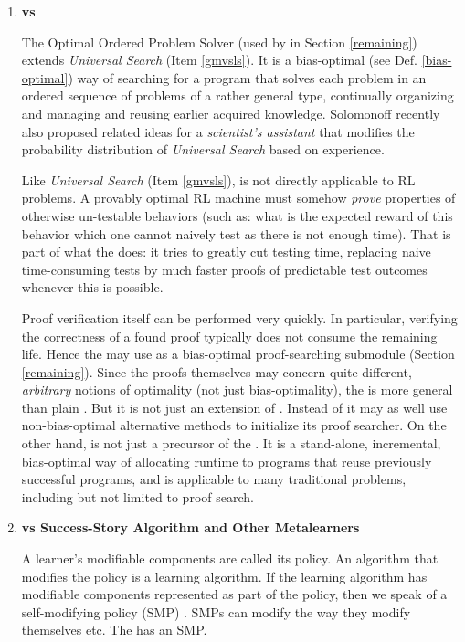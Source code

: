 \begin{enumerate}
\item{\bf \GM vs \Oops}
\label{oopsrl}
 
The Optimal  Ordered Problem Solver
\Oops \cite{Schmidhuber:04oops,Schmidhuber:03nips}
(used by \Biops in Section \ref{remaining}) extends
{\em Universal Search} (Item \ref{gmvsls}). It is a bias-optimal (see Def. \ref{bias-optimal})
way of searching for a
program that solves each problem in an ordered  sequence
of problems of a rather general type,
continually organizing and managing and reusing earlier acquired knowledge.
Solomonoff recently also proposed related
ideas for a {\em scientist's assistant}
\cite{Solomonoff:03} that modifies the probability
distribution of {\em Universal Search} \cite{Levin:73} based
on experience.

Like {\em Universal Search} (Item \ref{gmvsls}), 
\Oops is not directly applicable to
RL problems.  A provably optimal RL machine
must somehow {\em prove} properties of otherwise un-testable behaviors
(such as: what is the expected reward of this behavior which
one cannot naively test as there is not enough time).
That is part of what the \gm does: it tries
to greatly cut testing time, replacing naive time-consuming
tests by much faster proofs of predictable test outcomes
whenever this is possible.

Proof verification
itself can be performed very quickly. In particular,
verifying the correctness of
a found proof typically does not consume the remaining life.
Hence the \gm may use \Oops as a bias-optimal proof-searching
submodule (Section \ref{remaining}). Since the proofs themselves may concern quite
different, {\em arbitrary} notions of optimality (not just
bias-optimality), the \gm is more
general than plain \Oopsn.
But it is not just an extension of \Oopsn.  Instead of \Oops it may
as well use non-bias-optimal alternative methods to initialize
its proof searcher.
On the other hand, \Oops is not just a precursor of the \gmn.
It is a stand-alone, incremental, bias-optimal way of allocating
runtime to programs that reuse previously successful
programs, and is applicable to many traditional
problems, including but not limited to proof search.
\\

\item{\bf \GM vs Success-Story Algorithm and Other Metalearners}
\label{ssa}

A learner's modifiable components are called its policy. An algorithm
that modifies the policy is a learning algorithm. If the learning
algorithm has modifiable components represented as part of the policy,
then we speak of a self-modifying policy (SMP) \cite{Schmidhuber:97ssa}.
SMPs can modify the way they modify themselves etc.
The \gm has an SMP.


\end{enumerate}

